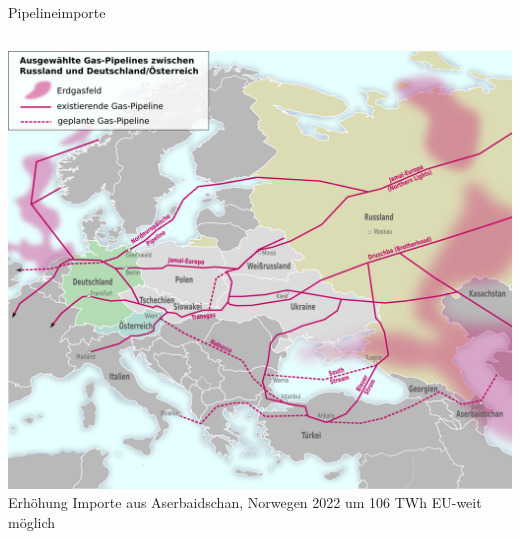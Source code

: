 \documentclass[10pt]{beamer}
\begin{document}
\begin{frame}{Pipelineimporte}
\begin{columns}
\includegraphics[width=\textwidth]{fig/gaspipelines.png}
\scriptsize{}
Erhöhung Importe aus Aserbaidschan, Norwegen 2022 um 106 TWh EU-weit möglich
\scriptsize{}
\end{columns}
\end{frame}
\end{document}
